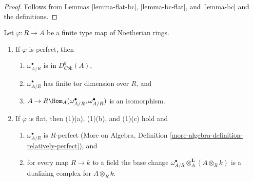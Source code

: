 \begin{proof}
Follows from Lemmas \ref{lemma-flat-bc}, \ref{lemma-bc-flat}, and
\ref{lemma-bc} and the definitions.
\end{proof}

\begin{lemma}
\label{lemma-relative-dualizing-algebraic}
Let $\varphi : R \to A$ be a finite type map of Noetherian rings.
\begin{enumerate}
\item If $\varphi$ is perfect, then
\begin{enumerate}
\item $\omega_{A/R}^\bullet$ is in $D^b_{\textit{Coh}}(A)$,
\item $\omega_{A/R}^\bullet$ has finite tor dimension over $R$, and
\item $A \to R\Hom_A(\omega_{A/R}^\bullet, \omega_{A/R}^\bullet)$
is an isomorphism.
\end{enumerate}
\item If $\varphi$ is flat, then (1)(a), (1)(b), and (1)(c) hold and
\begin{enumerate}
\item $\omega_{A/R}^\bullet$ is $R$-perfect
(More on Algebra,
Definition \ref{more-algebra-definition-relatively-perfect}), and
\item for every map $R \to k$ to a field the base change
$\omega_{A/R}^\bullet \otimes_A^\mathbf{L} (A \otimes_R k)$
is a dualizing complex for $A \otimes_R k$.
\end{enumerate}
\end{enumerate}
\end{lemma}

